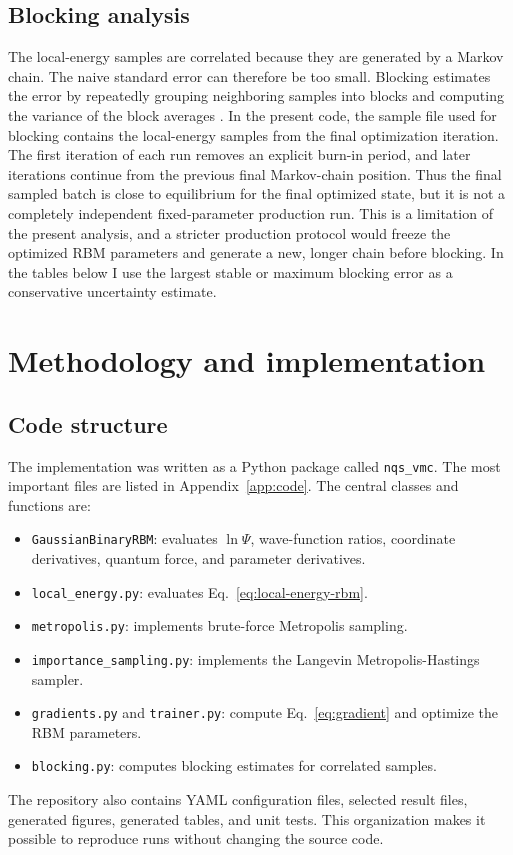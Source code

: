 \documentclass[10pt,a4paper]{article}
\newcommand{\code}[1]{\texttt{#1}}
\begin{document}
\subsection{Blocking analysis}

The local-energy samples are correlated because they are generated by a Markov chain. The naive standard error can therefore be too small. Blocking estimates the error by repeatedly grouping neighboring samples into blocks and computing the variance of the block averages \cite{flyvbjerg1989}. In the present code, the sample file used for blocking contains the local-energy samples from the final optimization iteration. The first iteration of each run removes an explicit burn-in period, and later iterations continue from the previous final Markov-chain position. Thus the final sampled batch is close to equilibrium for the final optimized state, but it is not a completely independent fixed-parameter production run. This is a limitation of the present analysis, and a stricter production protocol would freeze the optimized RBM parameters and generate a new, longer chain before blocking. In the tables below I use the largest stable or maximum blocking error as a conservative uncertainty estimate.

\section{Methodology and implementation}\label{sec:methodology}

\subsection{Code structure}

The implementation was written as a Python package called \code{nqs\_vmc}. The most important files are listed in Appendix~\ref{app:code}. The central classes and functions are:
\begin{itemize}[leftmargin=*]
    \item \code{GaussianBinaryRBM}: evaluates $\ln\Psi$, wave-function ratios, coordinate derivatives, quantum force, and parameter derivatives.
    \item \code{local\_energy.py}: evaluates Eq.~\eqref{eq:local-energy-rbm}.
    \item \code{metropolis.py}: implements brute-force Metropolis sampling.
    \item \code{importance\_sampling.py}: implements the Langevin Metropolis-Hastings sampler.
    \item \code{gradients.py} and \code{trainer.py}: compute Eq.~\eqref{eq:gradient} and optimize the RBM parameters.
    \item \code{blocking.py}: computes blocking estimates for correlated samples.
\end{itemize}
The repository also contains YAML configuration files, selected result files, generated figures, generated tables, and unit tests. This organization makes it possible to reproduce runs without changing the source code.
\end{document}
